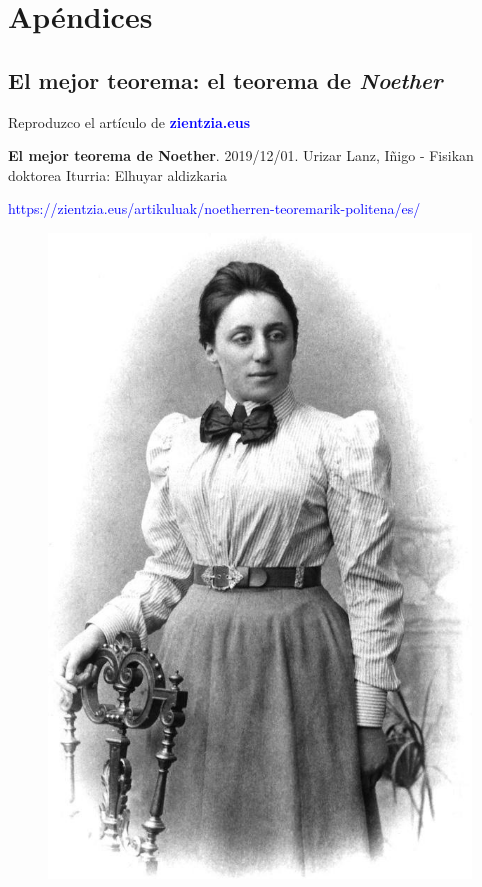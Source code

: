 \part{Apéndices}



\chapter{El mejor teorema: el teorema de \emph{Noether}}




Reproduzco el artículo de 	\textbf{\textcolor{blue}{zientzia.eus}}



\textbf{El mejor teorema de Noether}. 2019/12/01. Urizar Lanz, Iñigo - Fisikan doktorea Iturria: Elhuyar aldizkaria

\textcolor{blue}{https://zientzia.eus/artikuluak/noetherren-teoremarik-politena/es/}



	\begin{figure}[H]
	\centering
	\includegraphics[width=.4\textwidth]{imagenes/apendices-01-01.png}
\end{figure}





\newpage




